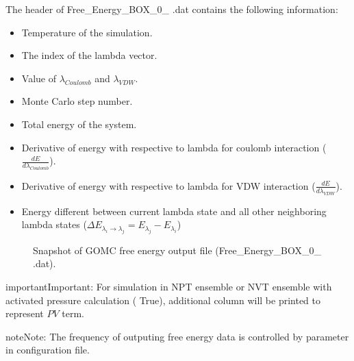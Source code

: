 \documentclass[letterpaper,10pt,english]{sphinxmanual}
\begin{document}
\sphinxAtStartPar
The header of Free\_Energy\_BOX\_0\_ .dat contains the following information:
\begin{itemize}
\item {} 
\sphinxAtStartPar
Temperature of the simulation.

\item {} 
\sphinxAtStartPar
The index of the lambda vector.

\item {} 
\sphinxAtStartPar
Value of \({\lambda}_{Coulomb}\) and \({\lambda}_{VDW}\).

\item {} 
\sphinxAtStartPar
Monte Carlo step number.

\item {} 
\sphinxAtStartPar
Total energy of the system.

\item {} 
\sphinxAtStartPar
Derivative of energy with respective to lambda for coulomb interaction (\(\frac{dE}{d\lambda_{Coulomb}}\)).

\item {} 
\sphinxAtStartPar
Derivative of energy with respective to lambda for VDW interaction (\(\frac{dE}{d\lambda_{VDW}}\)).

\item {} 
\sphinxAtStartPar
Energy different between current lambda state and all other neighboring lambda states
(\(\Delta E_{{\lambda}_i \rightarrow {\lambda}_j} = E_{{\lambda}_j} - E_{{\lambda}_i}\))

\end{itemize}

\begin{figure}[htbp]
\centering
\capstart

\noindent{}
\caption{Snapshot of GOMC free energy output file (Free\_Energy\_BOX\_0\_ .dat).}\label{\detokenize{output_file:id17}}\end{figure}

\begin{sphinxadmonition}{important}{Important:}
\sphinxAtStartPar
For simulation in NPT ensemble or NVT ensemble with activated pressure calculation (   True),
additional column will be printed to represent \(PV\) term.
\end{sphinxadmonition}

\begin{sphinxadmonition}{note}{Note:}
\sphinxAtStartPar
The frequency of outputing free energy data is controlled by  parameter in configuration file.
\end{sphinxadmonition}
\end{document}
